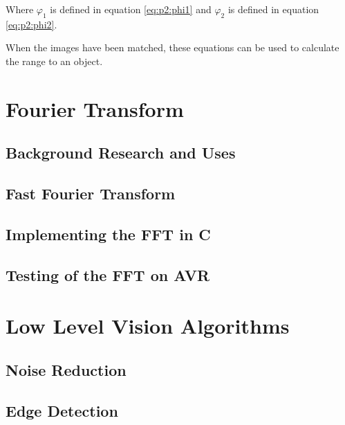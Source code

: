 Where $\varphi_1$ is defined in equation \eqref{eq:p2:phi1} and $\varphi_2$ is defined in equation \eqref{eq:p2:phi2}.

When the images have been matched, these equations can be used to calculate the range to an object.


\section{Fourier Transform}
\subsection{Background Research and Uses}
\subsection{Fast Fourier Transform}
\subsection{Implementing the FFT in C}
\subsection{Testing of the FFT on AVR}

\section{Low Level Vision Algorithms}
\subsection{Noise Reduction}
\subsection{Edge Detection}
